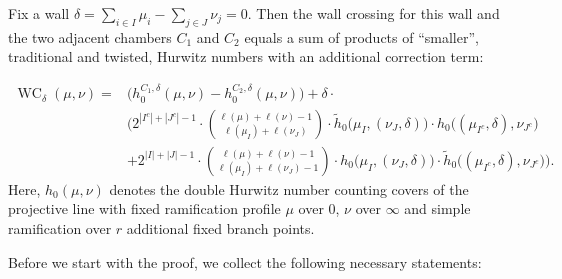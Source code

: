 \documentclass[ALCO,published]{cedram}
\DeclareMathOperator {\WC}{WC}
\begin{document}
\begin{prop}
\label{thm-wc}

Fix a wall $\delta=\sum_{i\in I}\mu_i - \sum_{j\in J}\nu_j=0$.
Then the wall crossing for this wall and the two adjacent chambers $C_1$ and $C_2$ equals a sum of products of ``smaller'', traditional and twisted, Hurwitz numbers with an additional correction term:

\begin{align*}
\WC_{\delta}(\mu,\nu)= &\big(h_0^{C_1,\delta}(\mu,\nu)- h_0^{C_2,\delta}(\mu,\nu)\big)+
  \delta\cdot \\
&\Big(2^{|I^c|+|J^c|-1}\cdot\binom{\ell(\mu)+\ell(\nu)-1}{\ell(\mu_I)+\ell(\nu_J)}\cdot \tilde{h}_0\big(\mu_I,(\nu_J,\delta)\big)\cdot h_0\big((\mu_{I^c},\delta),\nu_{J^c}\big)
\\&+2^{|I|+|J|-1}\cdot\binom{\ell(\mu)+\ell(\nu)-1}{\ell(\mu_I)+\ell(\nu_J)-1}\cdot h_0\big(\mu_I,(\nu_J,\delta)\big)\cdot \tilde{h}_0\big((\mu_{I^c},\delta),\nu_{J^c}\big)\Big).
\end{align*}
Here, $h_0(\mu,\nu)$ denotes the double Hurwitz number counting covers of the projective line with fixed ramification profile $\mu$ over $0$, $\nu$ over $\infty$ and simple ramification over $r$ additional fixed branch points.
\end{prop}

Before we start with the proof, we collect the following necessary statements:
\end{document}
